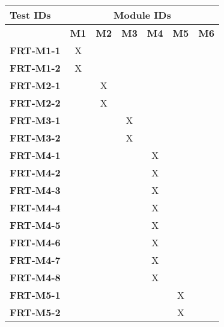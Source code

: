 \documentclass[12pt, titlepage]{article}
\begin{document}
\begin{longtable}{|l|cccccc|}
	\hline
	\textbf{Test IDs} & \multicolumn{6}{c|}{\textbf{Module IDs}} \\
	\hline
	~                 & \textbf{M1} & \textbf{M2} & \textbf{M3} & \textbf{M4} & \textbf{M5} & \textbf{M6} \\
	\hline
	\textbf{FRT-M1-1} & X           & ~           & ~           & ~           & ~           & ~           \\
	\textbf{FRT-M1-2} & X           & ~           & ~           & ~           & ~           & ~           \\
	\textbf{FRT-M2-1} & ~           & X           & ~           & ~           & ~           & ~           \\
	\textbf{FRT-M2-2} & ~           & X           & ~           & ~           & ~           & ~           \\
	\textbf{FRT-M3-1} & ~           & ~           & X           & ~           & ~           & ~           \\
	\textbf{FRT-M3-2} & ~           & ~           & X           & ~           & ~           & ~           \\
  \textbf{FRT-M4-1} & ~           & ~           & ~           & X           & ~           & ~           \\
	\textbf{FRT-M4-2} & ~           & ~           & ~           & X           & ~           & ~           \\
	\textbf{FRT-M4-3} & ~           & ~           & ~           & X           & ~           & ~           \\
	\textbf{FRT-M4-4} & ~           & ~           & ~           & X           & ~           & ~           \\
	\textbf{FRT-M4-5} & ~           & ~           & ~           & X           & ~           & ~           \\
	\textbf{FRT-M4-6} & ~           & ~           & ~           & X           & ~           & ~           \\
	\textbf{FRT-M4-7} & ~           & ~           & ~           & X           & ~           & ~           \\
	\textbf{FRT-M4-8} & ~           & ~           & ~           & X           & ~           & ~           \\
	\textbf{FRT-M5-1} & ~           & ~           & ~           & ~           & X           & ~           \\
	\textbf{FRT-M5-2} & ~           & ~           & ~           & ~           & X           & ~           \\

\end{longtable}
\end{document}
